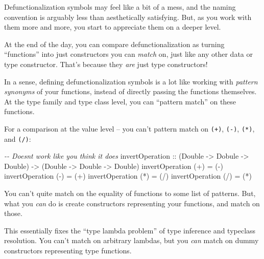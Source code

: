 \documentclass[]{article}
\newenvironment{Shaded}{}{}
\newcommand{\CommentTok}[1]{\textcolor[rgb]{0.38,0.63,0.69}{\textit{#1}}}
\newcommand{\DataTypeTok}[1]{\textcolor[rgb]{0.56,0.13,0.00}{#1}}
\newcommand{\NormalTok}[1]{#1}
\newcommand{\OperatorTok}[1]{\textcolor[rgb]{0.40,0.40,0.40}{#1}}
\newcommand{\OtherTok}[1]{\textcolor[rgb]{0.00,0.44,0.13}{#1}}
\begin{document}
Defunctionalization symbols may feel like a bit of a mess, and the naming
convention is arguably less than aesthetically satisfying. But, as you work with
them more and more, you start to appreciate them on a deeper level.

At the end of the day, you can compare defunctionalization as turning
``functions'' into just constructors you can \emph{match} on, just like any
other data or type constructor. That's because they \emph{are} just type
constructors!

In a sense, defining defunctionalization symbols is a lot like working with
\emph{pattern synonyms} of your functions, instead of directly passing the
functions themselves. At the type family and type class level, you can ``pattern
match'' on these functions.

For a comparison at the value level -- you can't pattern match on \texttt{(+)},
\texttt{(-)}, \texttt{(*)}, and \texttt{(/)}:

\begin{Shaded}
\begin{Highlighting}[]
\CommentTok{{-}{-} Doesn\textquotesingle{}t work like you think it does}
\OtherTok{invertOperation ::}\NormalTok{ (}\DataTypeTok{Double} \OtherTok{{-}\textgreater{}} \DataTypeTok{Dobule} \OtherTok{{-}\textgreater{}} \DataTypeTok{Double}\NormalTok{) }\OtherTok{{-}\textgreater{}}\NormalTok{ (}\DataTypeTok{Double} \OtherTok{{-}\textgreater{}} \DataTypeTok{Double} \OtherTok{{-}\textgreater{}} \DataTypeTok{Double}\NormalTok{)}
\NormalTok{invertOperation (}\OperatorTok{+}\NormalTok{) }\OtherTok{=}\NormalTok{ (}\OperatorTok{{-}}\NormalTok{)}
\NormalTok{invertOperation (}\OperatorTok{{-}}\NormalTok{) }\OtherTok{=}\NormalTok{ (}\OperatorTok{+}\NormalTok{)}
\NormalTok{invertOperation (}\OperatorTok{*}\NormalTok{) }\OtherTok{=}\NormalTok{ (}\OperatorTok{/}\NormalTok{)}
\NormalTok{invertOperation (}\OperatorTok{/}\NormalTok{) }\OtherTok{=}\NormalTok{ (}\OperatorTok{*}\NormalTok{)}
\end{Highlighting}
\end{Shaded}

You can't quite match on the equality of functions to some list of patterns.
But, what you \emph{can} do is create constructors representing your functions,
and match on those.

This essentially fixes the ``type lambda problem'' of type inference and
typeclass resolution. You can't match on arbitrary lambdas, but you \emph{can}
match on dummy constructors representing type functions.
\end{document}
